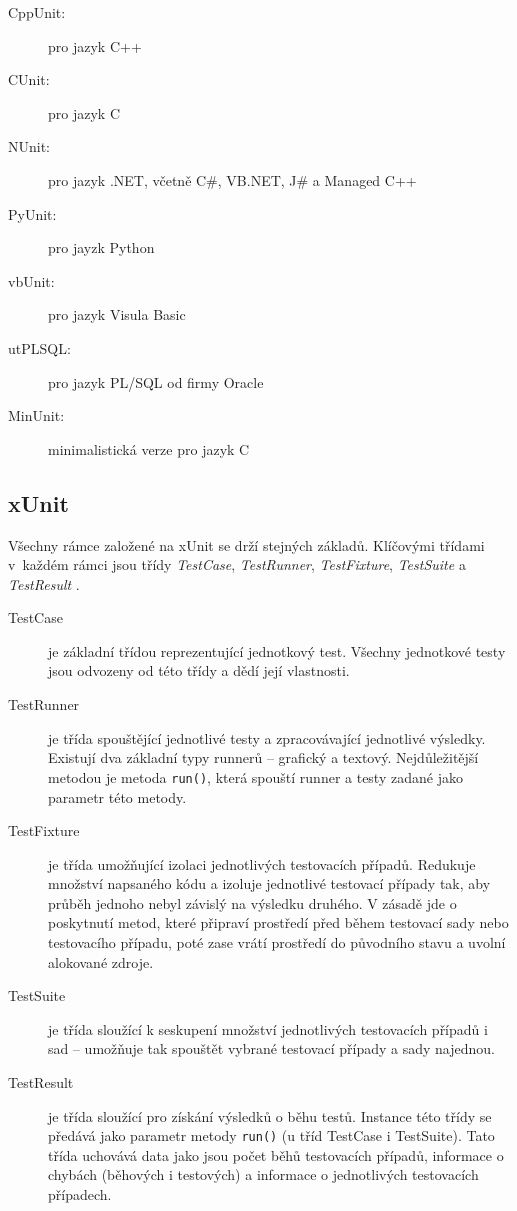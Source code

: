   \begin{description}
   \item[CppUnit:] pro jazyk C++
   \item[CUnit:] pro jazyk C
   \item[NUnit:] pro jazyk .NET, včetně C\#, VB.NET, J\# a Managed C++
   \item[PyUnit:] pro jayzk Python
   \item[vbUnit:] pro jazyk Visula Basic
   \item[utPLSQL:] pro jazyk PL/SQL od firmy Oracle
   \item[MinUnit:] minimalistická verze pro jazyk C
  \end{description}


    \subsection{xUnit}
    Všechny rámce založené na xUnit se drží stejných základů. Klíčovými třídami v~každém rámci jsou třídy \emph{TestCase}, \emph{TestRunner}, \emph{TestFixture}, \emph{TestSuite} a \emph{TestResult} \cite{UnitTestFrameworks}.

    \begin{description}
      \item[TestCase] je základní třídou reprezentující jednotkový test. Všechny jednotkové testy jsou odvozeny od této třídy a dědí její vlastnosti.
      \item[TestRunner] je třída spouštějící jednotlivé testy a zpracovávající jednotlivé výsledky. Existují dva základní typy runnerů -- grafický a textový. Nejdůležitější metodou je metoda \texttt{run()}, která spouští runner a testy zadané jako parametr této metody.
      \item[TestFixture] je třída umožňující izolaci jednotlivých testovacích případů. Redukuje množství napsaného kódu a izoluje jednotlivé testovací případy tak, aby průběh jednoho nebyl závislý na výsledku druhého. V zásadě jde o poskytnutí metod, které připraví prostředí před během testovací sady nebo testovacího případu, poté zase vrátí prostředí do původního stavu a uvolní alokované zdroje.
      \item[TestSuite] je třída sloužící k seskupení množství jednotlivých testovacích případů i sad -- umožňuje tak spouštět vybrané testovací případy a sady najednou.
      \item[TestResult] je třída sloužící pro získání výsledků o běhu testů. Instance této třídy se předává jako parametr metody \texttt{run()} (u tříd TestCase i TestSuite). Tato třída uchovává data jako jsou počet běhů testovacích případů, informace o chybách (běhových i testových) a informace o jednotlivých testovacích případech.
    \end{description}


